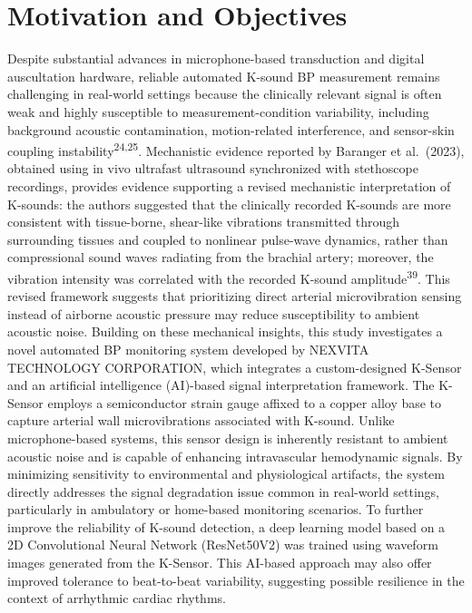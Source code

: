 \documentclass[
  12pt,
  letterpaper,
  openany,
  oneside]{book}
\begin{document}
\section{Motivation and Objectives}\label{motivation-and-objectives}

Despite substantial advances in microphone-based transduction and
digital auscultation hardware, reliable automated K-sound BP measurement
remains challenging in real-world settings because the clinically
relevant signal is often weak and highly susceptible to
measurement-condition variability, including background acoustic
contamination, motion-related interference, and sensor-skin coupling
instability\textsuperscript{24,25}. Mechanistic evidence reported by
Baranger et al.~(2023), obtained using in vivo ultrafast ultrasound
synchronized with stethoscope recordings, provides evidence supporting a
revised mechanistic interpretation of K-sounds: the authors suggested
that the clinically recorded K-sounds are more consistent with
tissue-borne, shear-like vibrations transmitted through surrounding
tissues and coupled to nonlinear pulse-wave dynamics, rather than
compressional sound waves radiating from the brachial artery; moreover,
the vibration intensity was correlated with the recorded K-sound
amplitude\textsuperscript{39}. This revised framework suggests that
prioritizing direct arterial microvibration sensing instead of airborne
acoustic pressure may reduce susceptibility to ambient acoustic noise.
Building on these mechanical insights, this study investigates a novel
automated BP monitoring system developed by NEXVITA TECHNOLOGY
CORPORATION, which integrates a custom-designed K-Sensor and an
artificial intelligence (AI)-based signal interpretation framework. The
K-Sensor employs a semiconductor strain gauge affixed to a copper alloy
base to capture arterial wall microvibrations associated with K-sound.
Unlike microphone-based systems, this sensor design is inherently
resistant to ambient acoustic noise and is capable of enhancing
intravascular hemodynamic signals. By minimizing sensitivity to
environmental and physiological artifacts, the system directly addresses
the signal degradation issue common in real-world settings, particularly
in ambulatory or home-based monitoring scenarios. To further improve the
reliability of K-sound detection, a deep learning model based on a 2D
Convolutional Neural Network (ResNet50V2) was trained using waveform
images generated from the K-Sensor. This AI-based approach may also
offer improved tolerance to beat-to-beat variability, suggesting
possible resilience in the context of arrhythmic cardiac rhythms.
\end{document}

